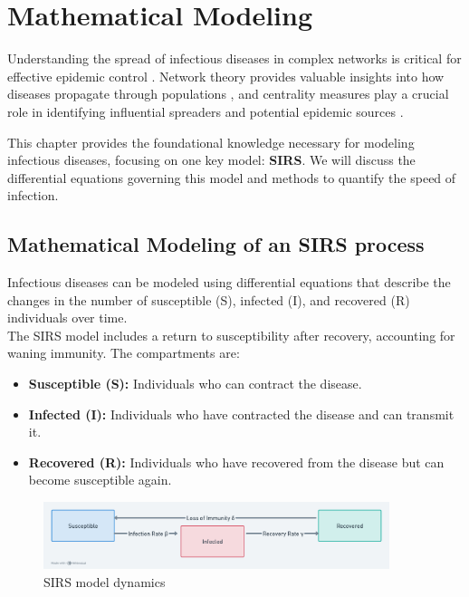 \chapter{Mathematical Modeling}

Understanding the spread of infectious diseases in complex networks is critical for effective epidemic control \cite{hellewell2020, britton2021}. Network theory provides valuable insights into how diseases propagate through populations \cite{newman2010}, and centrality measures play a crucial role in identifying influential spreaders and potential epidemic sources \cite{gomez2011}.

This chapter provides the foundational knowledge necessary for modeling infectious diseases, focusing on one key model: \textbf{SIRS}. We will discuss the differential equations governing this model and methods to quantify the speed of infection.

\section{Mathematical Modeling of an SIRS process}
Infectious diseases can be modeled using differential equations that describe the changes in the number of susceptible (S), infected (I), and recovered (R) individuals over time.\\
\noindent
The SIRS model includes a return to susceptibility after recovery, accounting for waning immunity. The compartments are:
\begin{itemize}
    \item \textbf{Susceptible (S):} Individuals who can contract the disease.
    \item \textbf{Infected (I):} Individuals who have contracted the disease and can transmit it.
    \item \textbf{Recovered (R):} Individuals who have recovered from the disease but can become susceptible again.
\end{itemize}

\begin{figure}[H]
    \centering
    \includegraphics[width=0.9\textwidth]{SIRS_Model_Dynamics.png}
    \caption{SIRS model dynamics}
    \label{fig:SIRS_Model_Dynamics}
\end{figure}

